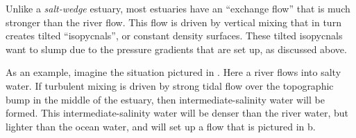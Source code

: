 Unlike a \emph{salt-wedge} estuary, most estuaries have an ``exchange flow'' that is much stronger than  the river flow.  This flow is driven by vertical mixing that in turn creates tilted ``isopycnals'', or constant density surfaces.  These tilted isopycnals want to slump due to the pressure gradients that are set up, as discussed above.

As an example, imagine the situation pictured in .  Here a river flows into salty water.  If turbulent mixing is driven by strong tidal flow over the topographic bump in the middle of the estuary, then intermediate-salinity water will be formed.  This intermediate-salinity water will be denser than the river water, but lighter than the ocean water, and will set up a flow that is pictured in b.

